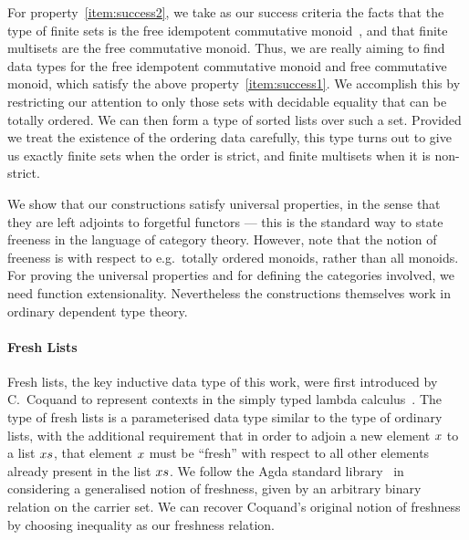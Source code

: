 \documentclass[a4paper]{easychair}
\newcommand{\AgdaBoundFontStyle}[1]{\textit{#1}}
\newcommand{\AgdaFormat}[2]{#2}
\newcommand{\AgdaNoSpaceMath}[1]
    {\begingroup\thickmuskip=0mu\medmuskip=0mu#1\endgroup}
\newcommand{\AgdaBound}[1]
    {\AgdaNoSpaceMath{\textcolor{AgdaBound}{\AgdaBoundFontStyle{\AgdaFormat{#1}{#1}}}}}
\newcommand\bv[1]{{\AgdaBound{$#1$}}}
\begin{document}
For property~\eqref{item:success2}, we take as our success criteria the facts that
the type of finite sets is the free idempotent commutative monoid~\cite{frumin2018finsetshott},
and that finite multisets are the free commutative monoid.
Thus, we are really aiming to find data types for the free idempotent commutative monoid and free commutative monoid, which satisfy the above property~\eqref{item:success1}.
We accomplish this by restricting our attention to only those sets with decidable equality that can be totally ordered.
We can then form a type of sorted lists over such a set.
Provided we treat the existence of the ordering data carefully, this type turns out to give us exactly finite sets when the order is strict, and finite multisets when it is non-strict.

We show that our constructions satisfy universal properties, in the sense that they are left adjoints to forgetful functors --- this is the standard way to state freeness in the language of category theory.
However, note that the notion of freeness is with respect to e.g.\ totally ordered monoids, rather than all monoids.
For proving the universal properties and for defining the categories involved, we need function extensionality.
Nevertheless the constructions themselves work in ordinary dependent type theory.

\paragraph{Fresh Lists}
Fresh lists, the key inductive data type of this work, were first introduced by C.~Coquand to represent contexts in the simply typed lambda calculus~\cite{ccoquand2002formalstlc}.
The type of fresh lists is a parameterised data type similar to the type of ordinary lists,
with the additional requirement that in order to adjoin
a new element $\bv{x}$ to a list $\bv{xs}$, that element $\bv{x}$ must be ``fresh'' with respect to all other elements already present in the list $\bv{xs}$.
We follow the Agda standard library~\cite{agda-stdlib} in considering a generalised notion of freshness, given by an arbitrary binary relation on the carrier set.
We can recover Coquand's original notion of freshness by choosing inequality as our freshness relation.
\end{document}
